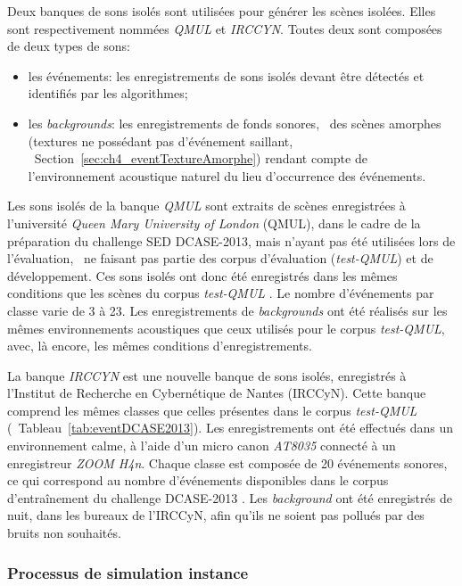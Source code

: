 Deux banques de sons isolés sont utilisées pour générer les scènes isolées. Elles sont respectivement nommées \emph{QMUL} et \emph{IRCCYN}. Toutes deux sont composées de deux types de sons:

\begin{itemize}
\item les événements: les enregistrements de sons isolés devant être détectés et identifiés par les algorithmes;
\item les \emph{backgrounds}: les enregistrements de fonds sonores, \ie~des scènes amorphes (textures ne possédant pas d'événement saillant, \cf~Section~\ref{sec:ch4_eventTextureAmorphe}) rendant compte de l’environnement acoustique naturel du lieu d'occurrence des événements. 
\end{itemize}

Les sons isolés de la banque \emph{QMUL} sont extraits de scènes enregistrées à l'université \emph{Queen Mary University of London} (QMUL), dans le cadre de la préparation du challenge SED DCASE-2013, mais n'ayant pas été utilisées lors de l'évaluation, \ie~ne faisant pas partie des corpus d'évaluation (\emph{test-QMUL}) et de développement. Ces sons isolés ont donc été enregistrés dans les mêmes conditions que les scènes du corpus \emph{test-QMUL} \citep{Giannoulis2013database}. Le nombre d'événements par classe varie de 3 à 23. Les enregistrements de \emph{backgrounds} ont été réalisés sur les mêmes environnements acoustiques que ceux utilisés pour le corpus \emph{test-QMUL}, avec, là encore, les mêmes conditions d'enregistrements.

La banque \emph{IRCCYN} est une nouvelle banque de sons isolés, enregistrés à l'Institut de Recherche en Cybernétique de Nantes (IRCCyN). Cette banque comprend les mêmes classes que celles présentes dans le corpus \emph{test-QMUL} (\cf~Tableau~\ref{tab:eventDCASE2013}). Les enregistrements ont été effectués dans un environnement calme, à l'aide d'un micro canon \emph{AT8035} connecté à un enregistreur \emph{ZOOM H4n}. Chaque classe est composée de 20 événements sonores, ce qui correspond au nombre d'événements disponibles dans le corpus d'entraînement du challenge DCASE-2013 \citep{Giannoulis2013database,giannoulis2013detection}. Les \emph{background} ont été enregistrés de nuit, dans les bureaux de l'IRCCyN, afin qu'ils ne soient pas pollués par des bruits non souhaités. 


\subsubsection{Processus de simulation instance}
\label{sec:ch7_simuProcessInstance}

